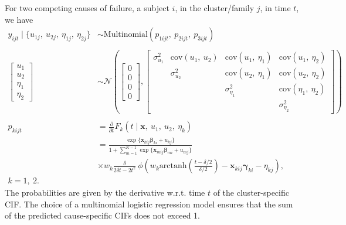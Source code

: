 For two competing causes of failure, a subject \(i\), in the
cluster/family \(j\), in time \(t\), we have
\begin{align}
  y_{i j t} \mid \{u_{1j},~u_{2j},~\eta_{1j},~\eta_{2j}\}
  &\sim\text{Multinomial}(p_{1ijt},~p_{2ijt},~p_{3ijt})\nonumber\\
  \nonumber\\
  \begin{bmatrix} u_{1}\\u_{2}\\\eta_{1}\\\eta_{2} \end{bmatrix}
  &\sim\mathcal{N} \left(\begin{bmatrix} 0\\0\\0\\0 \end{bmatrix},
  \begin{bmatrix}
    \sigma_{u_{1}}^{2}&
    \text{cov}(u_{1},~u_{2})&
    \text{cov}(u_{1},~\eta_{1})&\text{cov}(u_{1},~\eta_{2})\\
    &\sigma_{u_{2}}^{2}&
    \text{cov}(u_{2},~\eta_{1})&\text{cov}(u_{2},~\eta_{2})\\
    &&\sigma_{\eta_{1}}^{2}&\text{cov}(\eta_{1},~\eta_{2})\\
    &&&\sigma_{\eta_{2}}^{2}
  \end{bmatrix}\right)\nonumber\\
  \nonumber\\
  p_{kijt}
  &=\frac{\partial}{\partial t}
    F_{k} (t \mid \bm{x},~u_{1},~u_{2},~\eta_{k})
  \label{eq:model}\\
  &= \frac{\exp\{\bm{x}_{kij}\bm{\beta}_{ki} + u_{kj}\}}{
    1 + \sum_{m=1}^{K-1}\exp\{\bm{x}_{mij}\bm{\beta}_{mi} + u_{mj}\}}
  \nonumber\\
  &\times w_{k}\frac{\delta}{2\delta t - 2t^{2}}~
    \phi\left(
    w_{k}
    \text{arctanh}\left(\frac{t-\delta/2}{\delta/2}\right)
    - \bm{x}_{kij}\bm{\gamma}_{ki} - \eta_{kj}
    \right),\nonumber\\k = 1,~2.\nonumber
\end{align}
The probabilities are given by the derivative w.r.t. time \(t\) of the
cluster-specific CIF. The choice of a multinomial logistic regression
model ensures that the sum of the predicted cause-specific CIFs does not
exceed 1.

